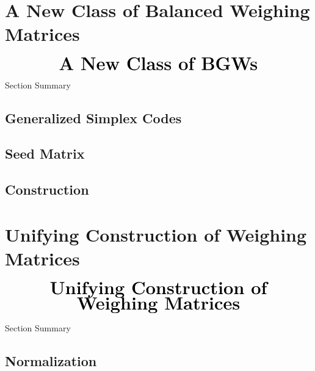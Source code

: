\documentclass{beamer}
\begin{document}

\section{A New Class of Balanced Weighing Matrices}

\begin{frame}
  \[
    \text{\huge\bf A New Class of BGWs}
  \]
\end{frame}

\begin{frame}{Section Summary}
  \tableofcontents[sections={3}]
\end{frame}

\subsection[]{Generalized Simplex Codes}
\subsection[]{Seed Matrix}
\subsection[]{Construction}


\section{Unifying Construction of Weighing Matrices}

\begin{frame}
  \[
    \begin{array}{c}
      \text{\huge\bf Unifying Construction of}
      \\
      \text{\huge\bf Weighing Matrices}
    \end{array}
  \]
\end{frame}

\begin{frame}{Section Summary}
  \tableofcontents[sections={4}]
\end{frame}

\subsection[]{Normalization}
\end{document}

